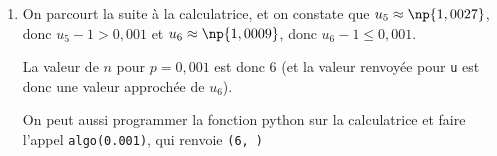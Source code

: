 \begin{enumerate}
\begin{enumerate}
Puis, à chaque exécution de la boucle \texttt{while},  \texttt{u} se voit affecter le terme suivant dans la suite $(u_n)$ et \texttt{n} se voit affecter l'entier suivant, donc l'indice correspondant au terme dont la valeur est stockée dans la variable \texttt{u}.

Cette boucle \texttt{while} tourne tant que l'écart entre le terme stocké dans la variable \texttt{u} et la limite 1 est strictement supérieur à la valeur \texttt{p}, qui est l'argument choisi pour invoquer la fonction.

Les valeurs \texttt{n} et \texttt{u} renvoyées par l'appel de la fonction \texttt{algo(p)} correspondent donc respectivement à l'indice et à la valeur du premier terme de la suite pour lequel l'écart entre le terme et la limite de la suite est inférieur ou égal à la valeur \texttt{p} choisie.

		\item On parcourt la suite à la calculatrice, et on constate que $u_5 \approx \np{1,0027}$, donc $u_5 - 1 > 0,001$ et $u_6 \approx \np{1,0009}$, donc $u_6 - 1 \leqslant 0,001$.

La valeur de $n$ pour $p=0,001$ est donc 6 (et la valeur renvoyée pour \texttt{u} est donc une valeur approchée de $u_6$).

On peut aussi programmer la fonction python sur la calculatrice et faire l'appel \texttt{algo(0.001)}, qui renvoie \texttt{(6, )}
	\end{enumerate}
\end{enumerate}

\bigskip
